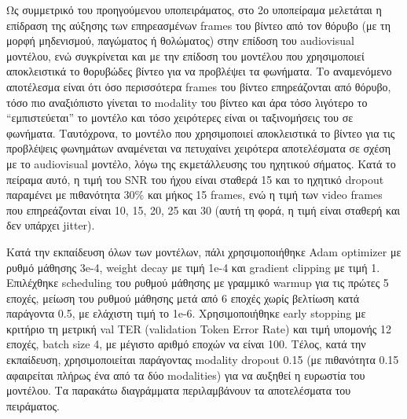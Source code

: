 Ως συμμετρικό του προηγούμενου υποπειράματος, στο 2ο υποπείραμα μελετάται η επίδραση της αύξησης των επηρεασμένων frames του βίντεο από τον θόρυβο (με τη μορφή μηδενισμού, παγώματος ή θολώματος) στην επίδοση του audiovisual μοντέλου, ενώ συγκρίνεται και με την επίδοση του μοντέλου που χρησιμοποιεί αποκλειστικά το θορυβώδες βίντεο για να προβλέψει τα φωνήματα. Το αναμενόμενο αποτέλεσμα είναι ότι όσο περισσότερα frames του βίντεο επηρεάζονται από θόρυβο, τόσο πιο αναξιόπιστο γίνεται το modality του βίντεο και άρα τόσο λιγότερο το ``εμπιστεύεται'' το μοντέλο και τόσο χειρότερες είναι οι ταξινομήσεις του σε φωνήματα. Ταυτόχρονα, το μοντέλο που χρησιμοποιεί αποκλειστικά το βίντεο για τις προβλέψεις φωνημάτων αναμένεται να πετυχαίνει χειρότερα αποτελέσματα σε σχέση με το audiovisual μοντέλο, λόγω της εκμετάλλευσης του ηχητικού σήματος. Κατά το πείραμα αυτό, η τιμή του SNR του ήχου είναι σταθερά 15 και το ηχητικό dropout παραμένει με πιθανότητα 30\% και μήκος 15 frames, ενώ η τιμή των video frames που επηρεάζονται είναι 10, 15, 20, 25 και 30 (αυτή τη φορά, η τιμή είναι σταθερή και δεν υπάρχει jitter).

Κατά την εκπαίδευση όλων των μοντέλων, πάλι χρησιμοποιήθηκε Adam optimizer με ρυθμό μάθησης 3e-4, weight decay με τιμή 1e-4 και gradient clipping με τιμή 1. Επιλέχθηκε scheduling του ρυθμού μάθησης με γραμμικό warmup για τις πρώτες 5 εποχές, μείωση του ρυθμού μάθησης μετά από 6 εποχές χωρίς βελτίωση κατά παράγοντα 0.5, με ελάχιστη τιμή το 1e-6.  Χρησιμοποιήθηκε early stopping με κριτήριο τη μετρική val TER (validation Token Error Rate) και τιμή υπομονής 12 εποχές, batch size 4, με μέγιστο αριθμό εποχών να είναι 100. Τέλος, κατά την εκπαίδευση, χρησιμοποιείται παράγοντας modality dropout 0.15 (με πιθανότητα 0.15 αφαιρείται πλήρως ένα από τα δύο modalities) για να αυξηθεί η ευρωστία του μοντέλου. Τα παρακάτω διαγράμματα περιλαμβάνουν τα αποτελέσματα του πειράματος.

